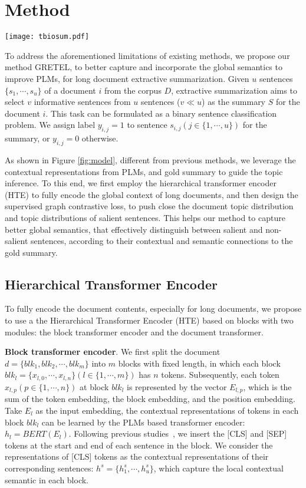 \documentclass[11pt]{article}
\begin{document}
\section{Method}
\begin{figure*}
  \centering
      \texttt{[image: tbiosum.pdf]}
\caption{The model architecture of GRETEL}
\label{fig:model}
\end{figure*}
To address the aforementioned limitations of existing methods, we propose our method GRETEL, to better capture and incorporate the global semantics to improve PLMs, for long document extractive summarization.
Given $u$ sentences $\{s_1,\cdots,s_u\}$ of a document $i$ from the corpus $D$, extractive summarization aims to select $v$ informative sentences from $u$ sentences ($v \ll u$) as the summary $S$ for the document $i$. 
This task can be formulated as a binary sentence classification problem. 
We assign label $y_{i,j}=1$ to sentence $s_{i,j} (j \in \{1,\cdots,u\})$ for the summary, or $y_{i,j}=0$ otherwise.

As shown in Figure \ref{fig:model}, different from previous methods, we leverage the contextual representations from PLMs, and gold summary to guide the topic inference.
To this end, we first employ the hierarchical transformer encoder (HTE) to fully encode the global context of long documents, and then design the supervised graph contrastive loss, to push close the document topic distribution and topic distributions of salient sentences.
This helps our method to capture better global semantics, that effectively distinguish between salient and non-salient sentences, according to their contextual and semantic connections to the gold summary.


\subsection{Hierarchical Transformer Encoder}
To fully encode the document contents, especially for long documents, we propose to use a the Hierarchical Transformer Encoder (HTE) based on blocks with two modules: the block transformer encoder and the document transformer.


\textbf{Block transformer encoder}. We first split the document $d=\{blk_1,blk_2,\cdots,blk_m\}$ into $m$ blocks with fixed length, in which each block $blk_l=\{x_{l,0},\cdots,x_{l,n}\} (l \in \{1,\cdots,m\})$ has $n$ tokens.
Subsequently, each token $x_{l,p}(p \in \{1,\cdots,n\})$ at block $blk_l$ is represented by the vector $E_{l,p}$, which is the sum of the token embedding, the block embedding, and the position embedding.
Take $E_l$ as the input embedding, the contextual representations of tokens in each block $blk_l$ can be learned by the PLMs based transformer encoder: $h_{l}= BERT(E_l)$.
Following previous studies~\cite{liu2019text}, we insert the [CLS] and [SEP] tokens at the start and end of each sentence in the block.
We consider the representations of [CLS] tokens as the contextual representations of their corresponding sentences: $h^s=\{h^s_1,\cdots,h^s_u\}$, which capture the local contextual semantic in each block. 
\end{document}
